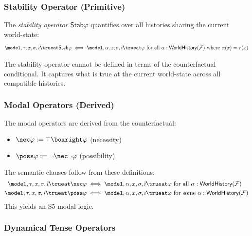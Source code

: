 \documentclass[../LogosReference.tex]{subfiles}
\begin{document}
\subsubsection{Stability Operator (Primitive)}

\begin{definition}[Stability]\label{def:stability-truth}
The \emph{stability operator} $\mathsf{Stab}\varphi$ quantifies over all histories sharing the current world-state:
\[
    \model, \tau, x, \assignment, \tempindex \trueat \mathsf{Stab}\metaA \iff
    \model, \alpha, x, \assignment, \tempindex \trueat \metaA \text{ for all } \alpha : \mathsf{WorldHistory}(\mframe) \text{ where } \alpha(x) = \tau(x)
\]
\end{definition}

\begin{remark}
The stability operator cannot be defined in terms of the counterfactual conditional.
It captures what is true at the current world-state across all compatible histories.
\end{remark}

\subsubsection{Modal Operators (Derived)}

\begin{remark}\label{rem:modal-derived}
The modal operators are derived from the counterfactual:
\begin{itemize}
    \item $\nec\metaA := \top \boxright \metaA$ (necessity)
    \item $\poss\metaA := \neg\nec\neg\metaA$ (possibility)
\end{itemize}
The semantic clauses follow from these definitions:
\begin{align}
    \model, \tau, x, \assignment, \tempindex \trueat \nec\metaA  & \iff \model, \alpha, x, \assignment, \tempindex \trueat \metaA \text{ for all } \alpha : \mathsf{WorldHistory}(\mframe)  \\
    \model, \tau, x, \assignment, \tempindex \trueat \poss\metaA & \iff \model, \alpha, x, \assignment, \tempindex \trueat \metaA \text{ for some } \alpha : \mathsf{WorldHistory}(\mframe)
\end{align}
This yields an S5 modal logic.
\end{remark}

\subsubsection{Dynamical Tense Operators}
\end{document}
